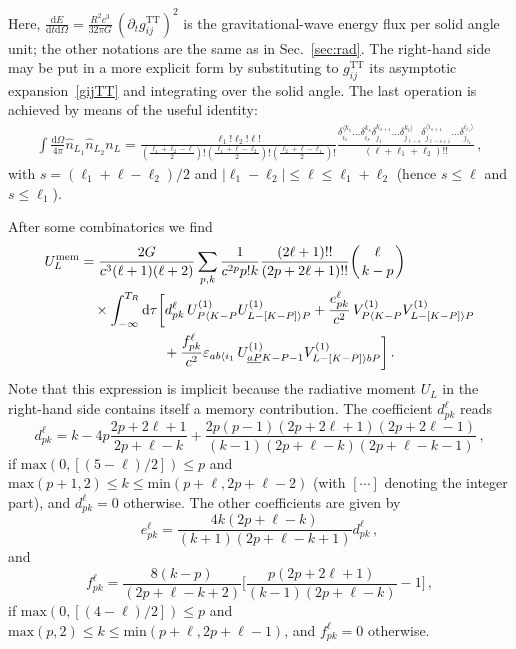 \documentclass[prd,preprint,superscriptaddress,tightenlines,nofootinbib,
  eqsecnum,showpacs]{revtex4}
\newcommand{\ud}{\mathrm{d}}
\begin{document}
Here, $\frac{\ud E}{\ud t\ud \Omega} = \frac{R^2c^3}{32\pi G}
\,(\partial_t g^\text{TT}_{ij})^2$ is the gravitational-wave energy
flux per solid angle unit; the other notations are the same as in
Sec.~\ref{sec:rad}. The right-hand side may be put in a more explicit
form by substituting to $g^\text{TT}_{ij}$ its asymptotic
expansion~\eqref{gijTT} and integrating over the solid angle. The last
operation is achieved by means of the useful identity:
%
\begin{align}
\int\frac{ \ud \Omega}{4\pi} \hat{n}_{L_1} \hat{n}_{L_2} n_L =
\frac{\ell_1!  \ell_2!  \ell!}{(\frac{\ell_1+\ell_2-\ell}{2})!
  (\frac{\ell_1+\ell-\ell_2}{2})!(\frac{\ell_2+\ell-\ell_1}{2})!}
\frac{\delta^{\langle k_1}_{i_1} \!\!\dots \delta^{k_s}_{i_s}\delta^{
    k_{s+1}}_{j_1} \!\!\dots \delta^{k_\ell \rangle}_{j_{\ell-s}}
  \delta^{\langle i_{s+1}}_{j_{\ell-s+1}} \!\!\dots
  \delta^{i_{\ell_1}\rangle}_{j_{\ell_2}}}{(\ell+\ell_1+\ell_2)!!} \,,
\end{align}
%
with $s=(\ell_1+\ell-\ell_2)/2$ and $|\ell_1-\ell_2|\leqslant \ell
\leqslant \ell_1+\ell_2$ (hence $s \leqslant \ell$ and $s \leqslant
\ell_1$).

After some combinatorics we find
%
\begin{align}
U_{L}^\text{mem} & = \frac{2G}{c^3 (\ell+1) (\ell+2)} \sum_{p, k}
\frac{1}{c^{2p}p! k} \frac{(2\ell +1)!!}{(2p+2\ell+1)!!}  \biggl(
\genfrac{}{}{0pt}{}{\ell}{k-p} \biggr) \nonumber \\ & \quad\times
\int_{-\infty}^{T_R} \ud\tau \biggl[ d^\ell_{pk} \, U^{(1)}_{P\langle
    K-P} U^{(1)}_{L-[K-P]\rangle P} + \frac{e^\ell_{pk}}{c^2} \,
  V^{(1)}_{P\langle K-P} V^{(1)}_{L-[K-P]\rangle P} \nonumber \\ &
  \qquad\qquad\qquad + \frac{f^\ell_{pk}}{c^2} \varepsilon_{ab\langle
    i_1} \, U^{(1)}_{\underline{aP} K-P-1} V^{(1)}_{L-[K-P]\rangle b
    P} \biggr] \,.
\end{align}
%
Note that this expression is implicit because the radiative moment
$U_L$ in the right-hand side contains itself a memory
contribution. The coefficient $d^\ell_{pk}$ reads
%
\begin{equation}
d^\ell_{pk} = k - 4 p \frac{2p+2\ell+1}{2p+\ell-k} +
\frac{2p(p-1)(2p+2\ell+1)(2p+2\ell-1)}{(k-1)(2p+\ell-k)
  (2p+\ell-k-1)}\,,
\end{equation}
% 
if $\text{max}(0, [(5-\ell)/2]) \leqslant p$ and $\text{max}(p+1,2)
\leqslant k \leqslant \text{min} (p+\ell, 2p + \ell -2)$ (with
$[\cdots]$ denoting the integer part), and $d^\ell_{pk} = 0$
otherwise. The other coefficients are given by
%
\begin{equation}
e^\ell_{pk} = \frac{4 k (2p+\ell-k)}{(k+1)(2p+\ell-k+1)}
d^\ell_{pk}\,,
\end{equation}
% 
and
%
\begin{equation}
f^\ell_{pk} = \frac{8 (k-p)}{(2p+\ell-k+2)} \biggl[
  \frac{p(2p+2\ell+1)}{(k-1)(2p+\ell-k)} -1 \biggr]\,,
\end{equation}
% 
if $\text{max}(0, [(4-\ell)/2]) \leqslant p$ and $\text{max}(p,2)
\leqslant k \leqslant \text{min} (p+\ell, 2p + \ell -1)$, and
$f^\ell_{pk} = 0$ otherwise.
\end{document}
